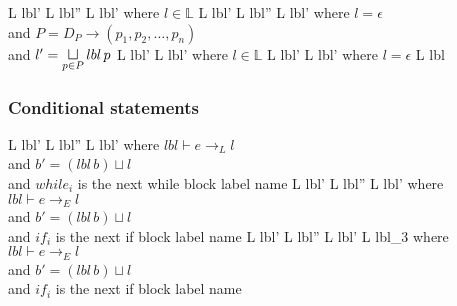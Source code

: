 \begin{trules}
        { {L} {lbl'} }
        { {L} {lbl''} \;\;  {L} {lbl'} }
        {where $l \in \mathbb{L}$}
        { {L} {lbl'} }
        { {L} {lbl''} \;  {L} {lbl'} }
        {where $l = \epsilon$\\
        and $P = D_P \rightarrow (p_1, p_2, \dots, p_n)$\\
        and $l' = \sqcupl\limits_{p \in P} lbl \, p$}
        { {L} {lbl'} }
        { {L} {lbl'} }
        {where $l \in \mathbb{L}$}
        { {L} {lbl'} }
        { {L} {lbl'} }
        {where $l = \epsilon$}
        { {L} {lbl} }
        {}
        {}
\end{trules}

\subsubsection{Conditional statements}

\begin{trules}
        { {L} {lbl'} }
        { {L} {lbl''} \;  {L} {lbl'} }
        {where $lbl \vdash e \rightarrow_L l$\\
          and $b' = (lbl \, b) \sqcup l$\\
          and $while_i$ is the next while block label name}
        { {L} {lbl'} }
        { {L} {lbl''} \;  {L} {lbl'} }
        {where $lbl \vdash e \rightarrow_E l$\\
          and $b' = (lbl \, b) \sqcup l$\\
          and $if_i$ is the next if block label name}
        { {L} {lbl'} }
        { {L} {lbl''} \;
           {L} {lbl'} \;
           {L} {lbl_3} }
        {where $lbl \vdash e \rightarrow_E l$\\
          and $b' = (lbl \, b) \sqcup l$\\
          and $if_i$ is the next if block label name}
\end{trules}


